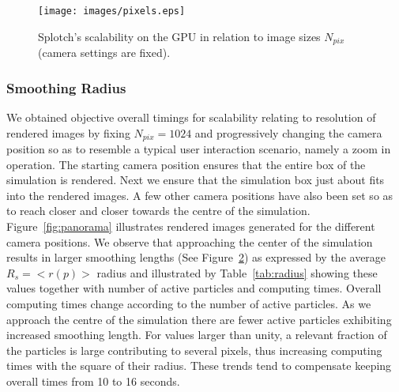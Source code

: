 \documentclass[1p]{elsarticle}
\begin{document}
\begin{figure}
\centering
\texttt{[image: images/pixels.eps]}
\caption{Splotch's scalability on the GPU in relation to image sizes $N_{pix}$ (camera settings are fixed).}
\label{fig:pixels}
\end{figure}
\subsubsection{Smoothing Radius}
\label{sec:smoothingradius}
We obtained objective overall timings for scalability relating to resolution of rendered images by fixing $N_{pix} = 1024$ and progressively changing the camera position so as to resemble a typical user interaction scenario, namely a zoom in operation. The starting camera position ensures that the entire box of the simulation is rendered. Next we ensure that the simulation box just about fits into the rendered images. A few other camera positions have also been set so as to reach closer and closer towards the centre of the simulation. Figure~\ref{fig:panorama} illustrates rendered images generated for the different camera positions.
 We observe that approaching the center of the simulation results in larger smoothing lengths (See Figure~\ref{fig:radii}) as expressed by the average $R_s=<r(p)>$ radius and illustrated by Table~\ref{tab:radius} showing these values together with number of active particles and computing times. 
Overall computing times change according to the number of active particles. As we approach the centre of the simulation there are fewer active particles exhibiting increased smoothing length. For values larger than unity, a relevant fraction of the particles is large contributing to several pixels, thus increasing computing times with the square of their radius. These trends tend to compensate keeping overall times from 10 to 16 seconds.
\begin{figure}
\centering
\caption{
}
\label{fig:radii}
\end{figure}
\end{document}
